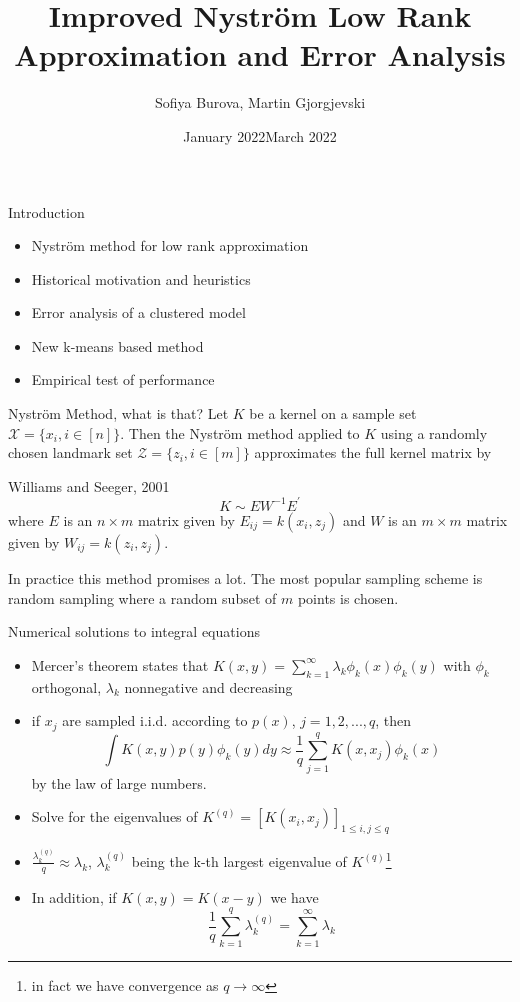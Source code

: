 \documentclass{beamer}
\title[Improved Nyström Low Rank Approximation and Error Analysis] %
{Improved Nyström Low Rank Approximation and Error Analysis}
\author[S. Burova, M. Gjorgjevski] %
{Sofiya Burova, Martin Gjorgjevski}
\institute[ENS Lyon] %
{
  ENS Lyon \\
  M2 Advanced Mathematics}
\date[Short Occasion] %
{January 2022}
\date{March 2022}
\begin{document}
\maketitle 

\begin{frame}{Introduction}
 
\begin{itemize}
    \item Nyström method for low rank approximation
    \item Historical motivation and heuristics
    \item Error analysis of a clustered model
    \item New k-means based method 
    \item Empirical test of performance
\end{itemize} 
\end{frame}
\begin{frame}{Nyström Method, what is that?}
Let $K$ be a kernel on a sample set $\mathcal{X}=\{x_i, i\in [n]\}$. Then the Nyström method applied to $K$ using a randomly chosen landmark set $\mathcal{Z}=\{z_i, i \in [m] \}$ approximates the full kernel matrix by 
\begin{block}{Williams and Seeger, 2001}
\begin{equation*}
    K \sim EW^{-1}E^{\prime}
\end{equation*}
where $E$ is an $n\times m$ matrix given by $E_{ij}=k(x_i,z_j) $ and $W$ is an $m\times m$ matrix given by $W_{ij}=k(z_i,z_j) $.
\end{block}

In practice this method promises a lot. 
The most popular sampling scheme is random sampling where a random subset of $m$ points is chosen.
\end{frame}
\begin{frame}{Numerical solutions to integral equations}


\begin{itemize}
    \item Mercer's theorem states that $K(x,y)=\sum_{k=1}^{\infty} \lambda_k \phi_k(x)\phi_k(y)$ 
    with $\phi_k$ orthogonal, $\lambda_k$ nonnegative and decreasing
    \item if $x_j$ are sampled i.i.d. according to $p(x)$, $j=1,2,...,q$, then
    \begin{equation*}
    \int K(x,y)p(y)\phi_k(y)dy\approx \frac{1}{q} \sum_{j=1}^q K(x,x_j)\phi_k(x)
    \end{equation*} 
    by the law of large numbers.
    \item Solve for the eigenvalues of $K^{(q)}=[K(x_i,x_j)]_{1\leq i,j\leq q}$
    \item $\frac{\lambda_k^{(q)}}{q}\approx \lambda_k$, $\lambda_k^{(q)}$ being the k-th largest eigenvalue of $K^{(q)}$\footnote{in fact we have convergence as $q\rightarrow\infty$}
    \item In addition, if $K(x,y)=K(x-y)$ we have
    \begin{equation*}
        \frac{1}{q} \sum_{k=1}^q \lambda_k^{(q)}=\sum_{k=1}^{\infty} \lambda_k
    \end{equation*}
\end{itemize}
\end{frame}
\end{document}

